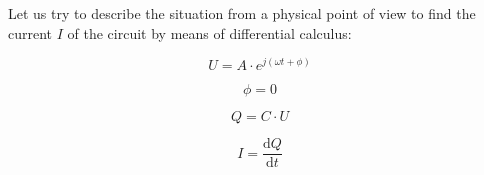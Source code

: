 \documentclass[a4paper, 10pt, final]{article} %
\begin{document}
    \noindent Let us try to describe the situation from a physical point of view to find the current $I$ of the circuit by means of differential calculus:
    \begin{figure}[H]
        \centering
        \begin{minipage}[b]{.21\linewidth}
            \centering
            \begin{equation} \label{eqn:CapTrasferFunctionExample1}
                U = A \cdot e^{j \left( \omega t + \phi \right)}
            \end{equation}
        \end{minipage}
        \hspace{0.04\linewidth}
        \begin{minipage}[b]{.21\linewidth}
            \centering
            \begin{equation} \label{eqn:CapTrasferFunctionExample2}
                \phi = 0
            \end{equation}
        \end{minipage}
        \hspace{0.04\linewidth}
        \begin{minipage}[b]{.21\linewidth}
            \centering
            \begin{equation} \label{eqn:CapTrasferFunctionExample3}
                Q = C \cdot U
            \end{equation}
        \end{minipage}
        \hspace{0.04\linewidth}
        \begin{minipage}[b]{.21\linewidth}
            \centering
            \begin{equation} \label{eqn:CapTrasferFunctionExample4}
                I = \frac{\textrm{d}Q}{\textrm{d}t}
            \end{equation}
        \end{minipage}
    \end{figure}
\end{document}
